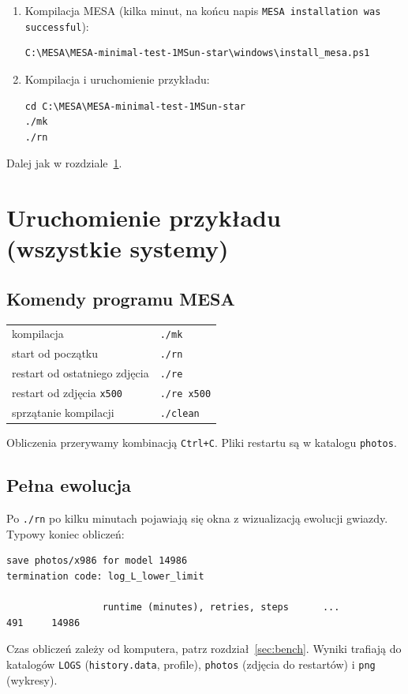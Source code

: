 \documentclass[11pt,a4paper]{article}
\begin{document}
\begin{enumerate}
\begin{verbatim}
. C:\MESA\MESA-minimal-test-1MSun-star\windows\mesa_env.ps1
\end{verbatim}
\item Kompilacja MESA (kilka minut, na końcu napis \texttt{MESA installation was successful}):
\begin{verbatim}
C:\MESA\MESA-minimal-test-1MSun-star\windows\install_mesa.ps1
\end{verbatim}
\item Kompilacja i uruchomienie przykładu:
\begin{verbatim}
cd C:\MESA\MESA-minimal-test-1MSun-star
./mk
./rn
\end{verbatim}
\end{enumerate}

Dalej jak w rozdziale~\ref{sec:run}.

\section{Uruchomienie przykładu (wszystkie systemy)}\label{sec:run}

\subsection{Komendy programu MESA}

\begin{center}
\begin{tabular}{ll}
\toprule
kompilacja & \verb!./mk! \\
start od początku & \verb!./rn! \\
restart od ostatniego zdjęcia & \verb!./re! \\
restart od zdjęcia \texttt{x500} & \verb!./re x500! \\
sprzątanie kompilacji & \verb!./clean! \\
\bottomrule
\end{tabular}
\end{center}
Obliczenia przerywamy kombinacją \texttt{Ctrl+C}. Pliki restartu są w katalogu \texttt{photos}.

\subsection{Pełna ewolucja}

Po \verb!./rn! po kilku minutach pojawiają się okna z wizualizacją ewolucji gwiazdy. Typowy koniec obliczeń:
\begin{verbatim}
save photos/x986 for model 14986
termination code: log_L_lower_limit

                 runtime (minutes), retries, steps      ...         491     14986
\end{verbatim}
Czas obliczeń zależy od komputera, patrz rozdział~\ref{sec:bench}. Wyniki trafiają do katalogów
\texttt{LOGS} (\texttt{history.data}, profile), \texttt{photos} (zdjęcia do restartów)
i \texttt{png} (wykresy).
\end{document}
